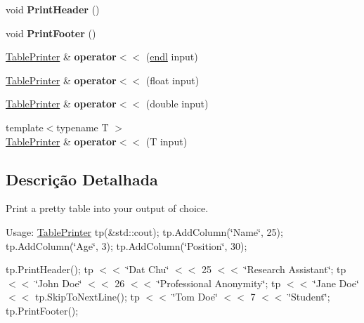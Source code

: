 \begin{DoxyCompactItemize}
\mbox{\label{classbprinter_1_1TablePrinter_a4022eb59d90fec098cda994b147ce9b3}} 
void {\bfseries Print\+Header} ()
\item 
\mbox{\label{classbprinter_1_1TablePrinter_a65a6732835a36a34017ac41b708510ad}} 
void {\bfseries Print\+Footer} ()
\item 
\mbox{\label{classbprinter_1_1TablePrinter_aba31c6d82844098a610f69bed00290f1}} 
\hyperlink{classbprinter_1_1TablePrinter}{Table\+Printer} \& {\bfseries operator$<$$<$} (\hyperlink{classbprinter_1_1endl}{endl} input)
\item 
\mbox{\label{classbprinter_1_1TablePrinter_a98cce99fc0d86a564e1496575b40066e}} 
\hyperlink{classbprinter_1_1TablePrinter}{Table\+Printer} \& {\bfseries operator$<$$<$} (float input)
\item 
\mbox{\label{classbprinter_1_1TablePrinter_a67571453e0af25730bc04e65e6844625}} 
\hyperlink{classbprinter_1_1TablePrinter}{Table\+Printer} \& {\bfseries operator$<$$<$} (double input)
\item 
\mbox{\label{classbprinter_1_1TablePrinter_ab988c02400fd35c0eb6b41159eea637b}} 
{\footnotesize template$<$typename T $>$ }\\\hyperlink{classbprinter_1_1TablePrinter}{Table\+Printer} \& {\bfseries operator$<$$<$} (T input)
\end{DoxyCompactItemize}


\subsection{Descrição Detalhada}
Print a pretty table into your output of choice.

Usage\+: \hyperlink{classbprinter_1_1TablePrinter}{Table\+Printer} tp(\&std\+::cout); tp.\+Add\+Column(\char`\"{}\+Name\char`\"{}, 25); tp.\+Add\+Column(\char`\"{}\+Age\char`\"{}, 3); tp.\+Add\+Column(\char`\"{}\+Position\char`\"{}, 30);

tp.\+Print\+Header(); tp $<$$<$ \char`\"{}\+Dat Chu\char`\"{} $<$$<$ 25 $<$$<$ \char`\"{}\+Research Assistant\char`\"{}; tp $<$$<$ \char`\"{}\+John Doe\char`\"{} $<$$<$ 26 $<$$<$ \char`\"{}\+Professional Anonymity\char`\"{}; tp $<$$<$ \char`\"{}\+Jane Doe\char`\"{} $<$$<$ tp.\+Skip\+To\+Next\+Line(); tp $<$$<$ \char`\"{}\+Tom Doe\char`\"{} $<$$<$ 7 $<$$<$ \char`\"{}\+Student\char`\"{}; tp.\+Print\+Footer();

